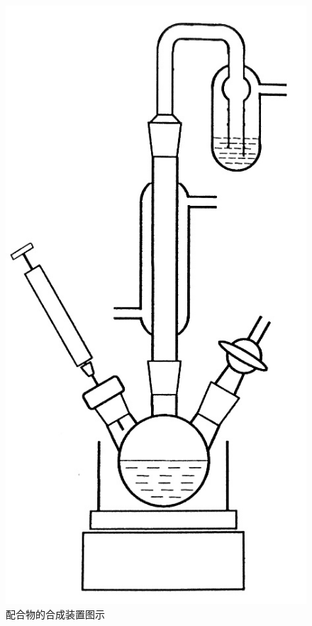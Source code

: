 \documentclass[a4paper,zihao=5,UTF8]{ctexart}
\begin{document}
    \begin{figure}[htbp]
        \centering
        \includegraphics[scale=0.7]{hechengzhuangzhi.png}
        \caption{配合物的合成装置图示}
        \label{hechengzhuangzhi}
    \end{figure}
\end{document}
